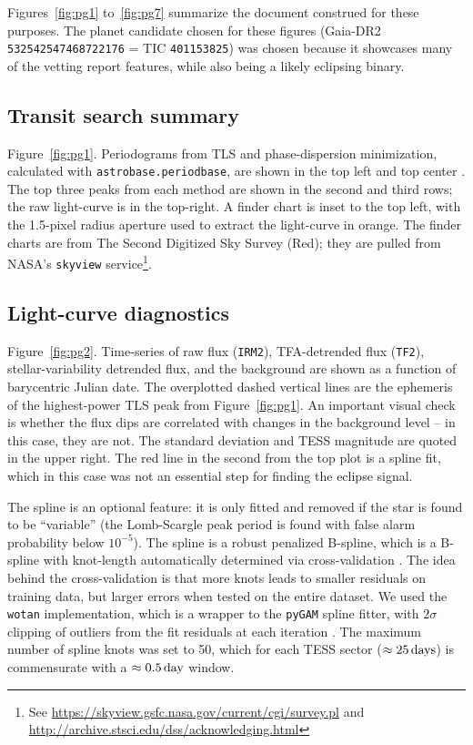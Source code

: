 \documentclass[12pt,twocolumn,tighten]{aastex62}
\begin{document}
Figures~\ref{fig:pg1} to~\ref{fig:pg7} summarize the document
construed for these purposes.  The planet candidate chosen for these
figures (Gaia-DR2 \texttt{532542547468722176} = TIC
\texttt{401153825}) was chosen because it showcases many of the
vetting report features, while also being a likely eclipsing binary.

\subsection{Transit search summary}
\label{sec:pg1}

Figure~\ref{fig:pg1}.  Periodograms from TLS and phase-dispersion
minimization, calculated with \texttt{astrobase.periodbase}, are shown
in the top left and top center
\citep{bhatti_astrobase_2018,hippke_TLS_2019,stellingwerf_period_1978}.
The top three peaks from each method are shown in the second and third
rows; the raw light-curve is in the top-right. A finder chart
is inset to the top left, with the 1.5-pixel radius aperture
used to extract the light-curve in orange.
The finder charts are from The Second Digitized Sky Survey (Red); they
are pulled from NASA's \texttt{skyview} service\footnote{See
\url{https://skyview.gsfc.nasa.gov/current/cgi/survey.pl} and
\url{http://archive.stsci.edu/dss/acknowledging.html}}.

\subsection{Light-curve diagnostics}
\label{sec:pg2}

Figure~\ref{fig:pg2}.
Time-series of raw flux (\texttt{IRM2}),  TFA-detrended flux
(\texttt{TF2}), stellar-variability detrended flux, and the background
are shown as a function of barycentric Julian date.  The overplotted
dashed vertical lines are the ephemeris of the highest-power TLS peak
from Figure~\ref{fig:pg1}.  An important visual check is whether the flux
dips are correlated with changes in the background level -- in this
case, they are not.  The standard deviation and TESS magnitude are
quoted in the upper right.  The red line in the second from the top
plot is a spline fit, which in this case was not an essential step for
finding the eclipse signal.

The spline is an optional feature: it is only fitted and removed if
the star is found to be ``variable'' (the Lomb-Scargle peak period is
found with false alarm probability below $10^{-5}$). The spline is a
robust penalized B-spline, which is a B-spline with knot-length
automatically determined via cross-validation
\citep{eilers_flexible_1996}. The idea behind the cross-validation is
that more knots leads to smaller residuals on training data, but
larger errors when tested on the entire dataset.  We used the
\texttt{wotan} implementation, which is a wrapper to the
\texttt{pyGAM} spline fitter, with $2\sigma$ clipping of outliers from
the fit residuals at each iteration
\citep{serven_pygam_2018_1476122,hippke_wotan_2019}.  The maximum
number of spline knots was set to 50, which for each TESS sector
($\approx 25\,{\rm days}$) is commensurate with a $\approx0.5\,{\rm
day}$ window.
\end{document}
